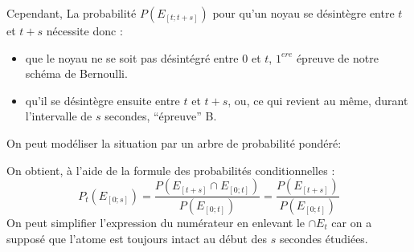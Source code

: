 \documentclass[a4paper,10pt,french]{scrartcl}
\begin{document}
Cependant, La probabilité $P(E_{[t;t+s]})$ pour qu’un noyau se désintègre entre $t$ et $t + s$ nécessite donc :
\begin{itemize}
 \item que le noyau ne se soit pas désintégré entre $0$ et $t$, $1^{ere}$ épreuve de notre schéma de Bernoulli.

 \item qu’il se désintègre ensuite entre $t$ et $t + s$, ou, ce qui revient au même, durant l'intervalle de $s$ secondes, ``épreuve'' B.
\end{itemize}
On peut modéliser la situation par un arbre de probabilité pondéré:
\begin{center}
\end{center}


On obtient, à l'aide de la formule des probabilités conditionnelles :
\[
P_t(E_{[0;s]}) = \frac{P(E_{[t+s]} \cap E_{[0;t]})}{P(E_{[0;t]})} = \frac{P(E_{[t+s]})}{P(E_{[0;t]})}
\]
On peut simplifier l'expression du numérateur en enlevant le $\cap E_t$ car on a supposé que l'atome est toujours intact au début des $s$ secondes étudiées.
\end{document}
